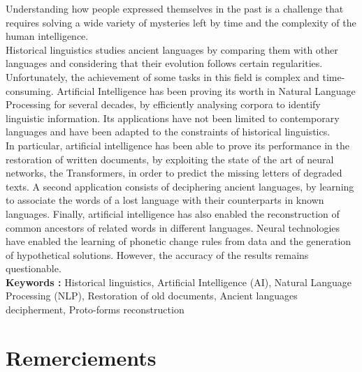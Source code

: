 \documentclass[12pt, twoside]{report}
\begin{document}
Understanding how people expressed themselves in the past is a challenge that requires solving a wide variety of mysteries left by time and the complexity of the human intelligence.\\

Historical linguistics studies ancient languages by comparing them with other languages and considering that their evolution follows certain regularities. Unfortunately, the achievement of some tasks in this field is complex and time-consuming. Artificial Intelligence has been proving its worth in Natural Language Processing for several decades, by efficiently analysing corpora to identify linguistic information. Its applications have not been limited to contemporary languages and have been adapted to the constraints of historical linguistics.\\
\indent In particular, artificial intelligence has been able to prove its performance in the restoration of written documents, by exploiting the state of the art of neural networks, the Transformers, in order to predict the missing letters of degraded texts. A second application consists of deciphering ancient languages, by learning to associate the words of a lost language with their counterparts in known languages. Finally, artificial intelligence has also enabled the reconstruction of common ancestors of related words in different languages. Neural technologies have enabled the learning of phonetic change rules from data and the generation of hypothetical solutions. However, the accuracy of the results remains questionable.\\

\textbf{Keywords :} Historical linguistics, Artificial Intelligence (AI),  Natural Language Processing (NLP), Restoration of old documents, Ancient languages decipherment, Proto-forms reconstruction

\section*{Remerciements}
\end{document}
